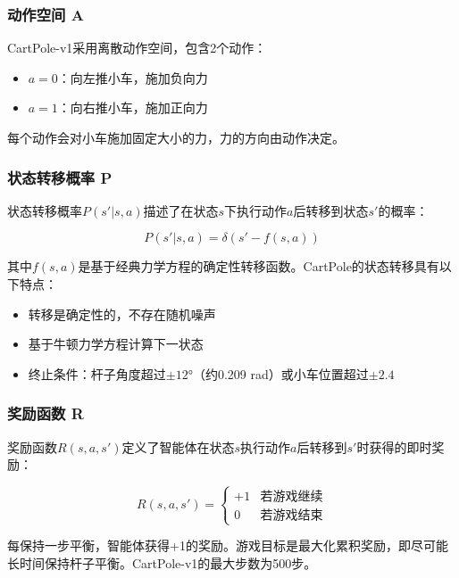 \documentclass[12pt,a4paper]{article}
\begin{document}
\subsubsection{动作空间 A}

CartPole-v1采用离散动作空间，包含2个动作：

\begin{itemize}
    \item $a=0$：向左推小车，施加负向力
    \item $a=1$：向右推小车，施加正向力
\end{itemize}

每个动作会对小车施加固定大小的力，力的方向由动作决定。

\subsubsection{状态转移概率 P}

状态转移概率$P(s'|s,a)$描述了在状态$s$下执行动作$a$后转移到状态$s'$的概率：

\begin{equation}
P(s'|s,a) = \delta(s' - f(s,a))
\end{equation}

其中$f(s,a)$是基于经典力学方程的确定性转移函数。CartPole的状态转移具有以下特点：

\begin{itemize}
    \item 转移是确定性的，不存在随机噪声
    \item 基于牛顿力学方程计算下一状态
    \item 终止条件：杆子角度超过$\pm 12°$（约0.209 rad）或小车位置超过$\pm 2.4$
\end{itemize}

\subsubsection{奖励函数 R}

奖励函数$R(s,a,s')$定义了智能体在状态$s$执行动作$a$后转移到$s'$时获得的即时奖励：

\begin{equation}
R(s,a,s') = 
\begin{cases}
+1 & \text{若游戏继续}\\
0 & \text{若游戏结束}
\end{cases}
\end{equation}

每保持一步平衡，智能体获得+1的奖励。游戏目标是最大化累积奖励，即尽可能长时间保持杆子平衡。CartPole-v1的最大步数为500步。
\end{document}
